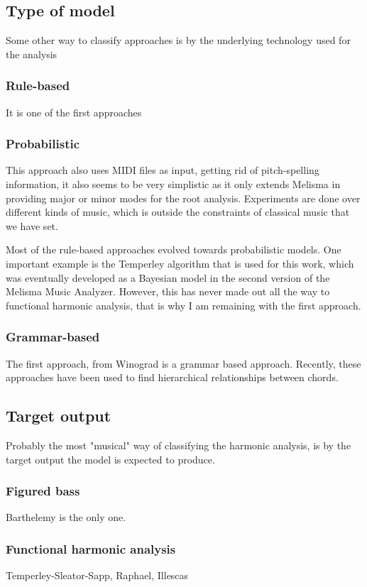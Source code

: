   \subsection{Type of model}
  Some other way to classify approaches is by the underlying technology used for the analysis
    \subsubsection{Rule-based}
    It is one of the first approaches
    \subsubsection{Probabilistic}

    This approach also uses MIDI files as input, getting rid of pitch-spelling information, it also seems to be very simplistic as it only extends Melisma in providing major or minor modes for the root analysis. Experiments are done over different kinds of music, which is outside the constraints of classical music that we have set.

    Most of the rule-based approaches evolved towards probabilistic models. One important example is the Temperley algorithm that is used for this work, which was eventually developed as a Bayesian model in the second version of the Melisma Music Analyzer. However, this has never made out all the way to functional harmonic analysis, that is why I am remaining with the first approach.
    \subsubsection{Grammar-based}
    The first approach, from Winograd is a grammar based approach. Recently, these approaches have been used to find hierarchical relationships between chords.
  \subsection{Target output}
  Probably the most "musical" way of classifying the harmonic analysis, is by the target output the model is expected to produce.
    \subsubsection{Figured bass}
    Barthelemy is the only one.
    \subsubsection{Functional harmonic analysis}
    Temperley-Sleator-Sapp, Raphael, Illescas

